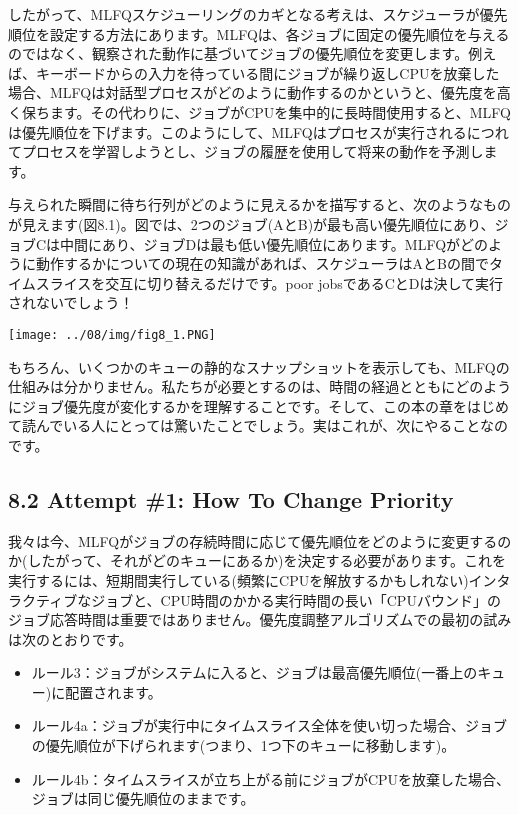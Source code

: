 したがって、MLFQスケジューリングのカギとなる考えは、スケジューラが優先順位を設定する方法にあります。MLFQは、各ジョブに固定の優先順位を与えるのではなく、観察された動作に基づいてジョブの優先順位を変更します。例えば、キーボードからの入力を待っている間にジョブが繰り返しCPUを放棄した場合、MLFQは対話型プロセスがどのように動作するのかというと、優先度を高く保ちます。その代わりに、ジョブがCPUを集中的に長時間使用すると、MLFQは優先順位を下げます。このようにして、MLFQはプロセスが実行されるにつれてプロセスを学習しようとし、ジョブの履歴を使用して将来の動作を予測します。

与えられた瞬間に待ち行列がどのように見えるかを描写すると、次のようなものが見えます(図8.1)。図では、2つのジョブ(AとB)が最も高い優先順位にあり、ジョブCは中間にあり、ジョブDは最も低い優先順位にあります。MLFQがどのように動作するかについての現在の知識があれば、スケジューラはAとBの間でタイムスライスを交互に切り替えるだけです。poor
jobsであるCとDは決して実行されないでしょう！

\texttt{[image: ../08/img/fig8\_1.PNG]}

もちろん、いくつかのキューの静的なスナップショットを表示しても、MLFQの仕組みは分かりません。私たちが必要とするのは、時間の経過とともにどのようにジョブ優先度が変化するかを理解することです。そして、この本の章をはじめて読んでいる人にとっては驚いたことでしょう。実はこれが、次にやることなのです。

\hypertarget{attempt-1-how-to-change-priority}{%
\subsection*{8.2 Attempt \#1: How To Change
Priority}\label{attempt-1-how-to-change-priority}}

我々は今、MLFQがジョブの存続時間に応じて優先順位をどのように変更するのか(したがって、それがどのキューにあるか)を決定する必要があります。これを実行するには、短期間実行している(頻繁にCPUを解放するかもしれない)インタラクティブなジョブと、CPU時間のかかる実行時間の長い「CPUバウンド」のジョブ応答時間は重要ではありません。優先度調整アルゴリズムでの最初の試みは次のとおりです。

\begin{itemize}
\tightlist
\item
  ルール3：ジョブがシステムに入ると、ジョブは最高優先順位(一番上のキュー)に配置されます。
\item
  ルール4a：ジョブが実行中にタイムスライス全体を使い切った場合、ジョブの優先順位が下げられます(つまり、1つ下のキューに移動します)。
\item
  ルール4b：タイムスライスが立ち上がる前にジョブがCPUを放棄した場合、ジョブは同じ優先順位のままです。
\end{itemize}

